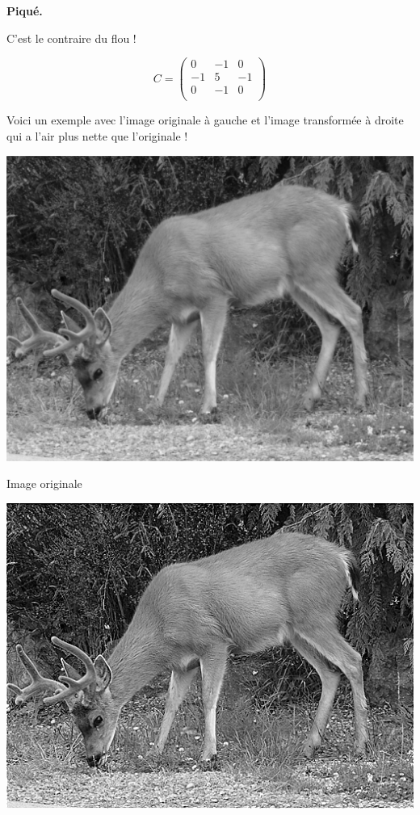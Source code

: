 \documentclass[11pt,class=report,crop=false]{standalone}
\begin{document}
\begin{activite}
\textbf{Piqué.}

C'est le contraire du flou !

$$C = 
\begin{pmatrix}
0&-1&0\\
-1&5&-1\\
0&-1&0\\
\end{pmatrix}$$

Voici un exemple avec l'image originale à gauche et l'image transformée à droite qui a l'air plus nette que l'originale !
\begin{center}
	\begin{minipage}{0.45\textwidth}\center
		\includegraphics[scale=\myscale,scale=0.3]{png/renne}
		
		Image originale
	\end{minipage}
	\begin{minipage}{0.45\textwidth}\center
		\includegraphics[scale=\myscale,scale=0.3]{png/renne_conv_pique}
		

\end{minipage}
\end{center}
\end{activite}
\end{document}
